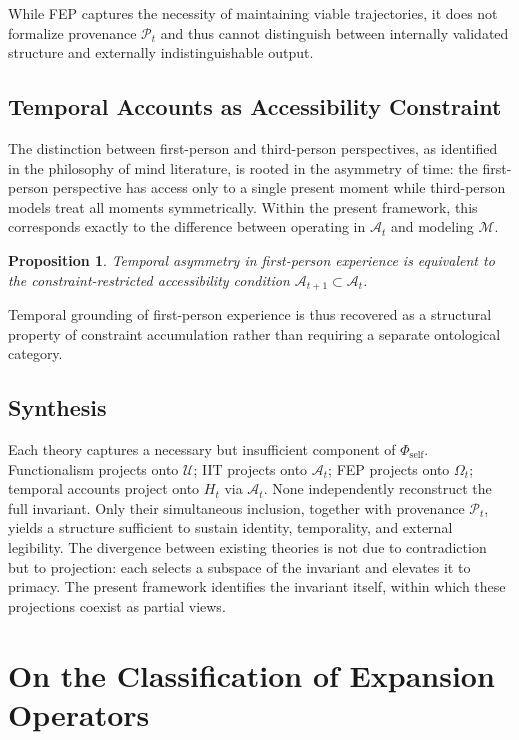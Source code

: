 \documentclass[12pt, a4paper]{article}
\theoremstyle{plain}
\newtheorem{proposition}[theorem]{Proposition}
\theoremstyle{definition}
\theoremstyle{remark}
\begin{document}
While FEP captures the necessity of maintaining viable trajectories, it does not formalize provenance $\mathcal{P}_t$ and thus cannot distinguish between internally validated structure and externally indistinguishable output.

\subsection{Temporal Accounts as Accessibility Constraint}

The distinction between first-person and third-person perspectives, as identified in the philosophy of mind literature, is rooted in the asymmetry of time: the first-person perspective has access only to a single present moment while third-person models treat all moments symmetrically. Within the present framework, this corresponds exactly to the difference between operating in $\mathcal{A}_t$ and modeling $\mathcal{M}$.

\begin{proposition}
Temporal asymmetry in first-person experience is equivalent to the constraint-restricted accessibility condition $\mathcal{A}_{t+1} \subset \mathcal{A}_t$.
\end{proposition}

Temporal grounding of first-person experience is thus recovered as a structural property of constraint accumulation rather than requiring a separate ontological category.

\subsection{Synthesis}

Each theory captures a necessary but insufficient component of $\Phi_{\mathrm{self}}$. Functionalism projects onto $\mathcal{U}$; IIT projects onto $\mathcal{A}_t$; FEP projects onto $\Omega_t$; temporal accounts project onto $H_t$ via $\mathcal{A}_t$. None independently reconstruct the full invariant. Only their simultaneous inclusion, together with provenance $\mathcal{P}_t$, yields a structure sufficient to sustain identity, temporality, and external legibility. The divergence between existing theories is not due to contradiction but to projection: each selects a subspace of the invariant and elevates it to primacy. The present framework identifies the invariant itself, within which these projections coexist as partial views.

\section{On the Classification of Expansion Operators}
\end{document}
